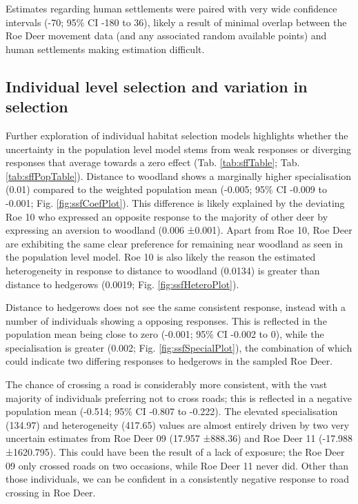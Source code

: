 \documentclass[10pt,a4paper]{article}
\begin{document}
Estimates regarding human settlements were paired with very wide confidence intervals (-70; 95\% CI -180 to 36), likely a result of minimal overlap between the Roe Deer movement data (and any associated random available points) and human settlements making estimation difficult.

\subsection{Individual level selection and variation in selection}\label{individual-level-selection-and-variation-in-selection}

Further exploration of individual habitat selection models highlights whether the uncertainty in the population level model stems from weak responses or diverging responses that average towards a zero effect (Tab. \ref{tab:sffTable}; Tab. \ref{tab:sffPopTable}).
Distance to woodland shows a marginally higher specialisation (0.01) compared to the weighted population mean (-0.005; 95\% CI -0.009 to -0.001; Fig. \ref{fig:ssfCoefPlot}).
This difference is likely explained by the deviating Roe 10 who expressed an opposite response to the majority of other deer by expressing an aversion to woodland (0.006 ±0.001).
Apart from Roe 10, Roe Deer are exhibiting the same clear preference for remaining near woodland as seen in the population level model.
Roe 10 is also likely the reason the estimated heterogeneity in response to distance to woodland (0.0134) is greater than distance to hedgerows (0.0019; Fig. \ref{fig:ssfHeteroPlot}).

Distance to hedgerows does not see the same consistent response, instead with a number of individuals showing a opposing responses.
This is reflected in the population mean being close to zero (-0.001; 95\% CI -0.002 to 0), while the specialisation is greater (0.002; Fig. \ref{fig:ssfSpecialPlot}), the combination of which could indicate two differing responses to hedgerows in the sampled Roe Deer.

The chance of crossing a road is considerably more consistent, with the vast majority of individuals preferring not to cross roads; this is reflected in a negative population mean (-0.514; 95\% CI -0.807 to -0.222).
The elevated specialisation (134.97) and heterogeneity (417.65) values are almost entirely driven by two very uncertain estimates from Roe Deer 09 (17.957 ±888.36) and Roe Deer 11 (-17.988 ±1620.795).
This could have been the result of a lack of exposure; the Roe Deer 09 only crossed roads on two occasions, while Roe Deer 11 never did.
Other than those individuals, we can be confident in a consistently negative response to road crossing in Roe Deer.
\end{document}
